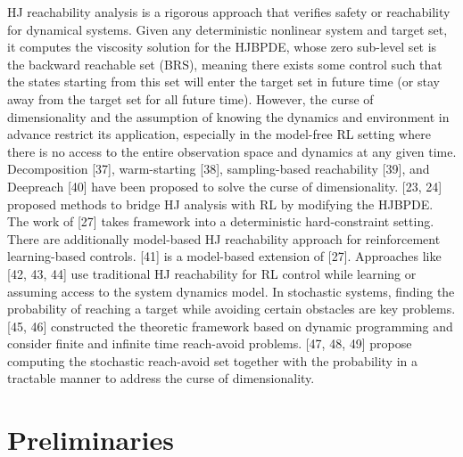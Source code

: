 \documentclass{article}
\theoremstyle{definition}
\begin{document}
HJ reachability analysis is a rigorous approach that verifies safety or reachability for dynamical systems. Given any deterministic nonlinear system and target set, it computes the viscosity solution for the HJBPDE, whose zero sub-level set is the backward reachable set (BRS), meaning there exists some control such that the states starting from this set will enter the target set in future time (or stay away from the target set for all future time). However, the curse of dimensionality and the assumption of knowing the dynamics and environment in advance restrict its application, especially in the model-free RL setting where there is no access to the entire observation space and dynamics at any given time. Decomposition [37], warm-starting [38], sampling-based reachability [39], and Deepreach [40] have been proposed to solve the curse of dimensionality. [23, 24] proposed methods to bridge HJ analysis with RL by modifying the HJBPDE. The work of [27] takes framework into a deterministic hard-constraint setting. There are additionally model-based HJ reachability approach for reinforcement learning-based controls. [41] is a model-based extension of [27]. Approaches like [42, 43, 44] use traditional HJ reachability for RL control while learning or assuming access to the system dynamics model. In stochastic systems, finding the probability of reaching a target while avoiding certain obstacles are key problems. [45, 46] constructed the theoretic framework based on dynamic programming and consider finite and infinite time reach-avoid problems. [47, 48, 49] propose computing the stochastic reach-avoid set together with the probability in a tractable manner to address the curse of dimensionality.

\section{Preliminaries}
\end{document}
